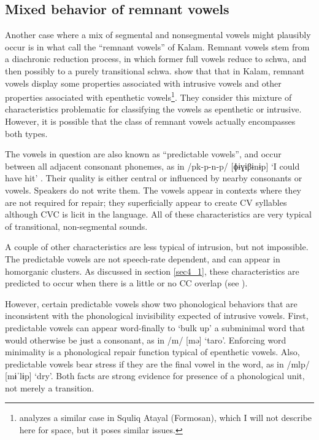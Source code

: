 \documentclass[output=paper,colorlinks,citecolor=brown]{langscibook}
\begin{document}
\subsection{Mixed behavior of remnant vowels}\label{sec4_4}

Another case where a mix of segmental and nonsegmental vowels might plausibly occur is in what \citet{Blevins&Pawley} call the “remnant vowels” of Kalam. Remnant vowels stem from a diachronic reduction process, in which former full vowels reduce to schwa, and then possibly to a purely transitional schwa. \citet{Blevins&Pawley} show that that in Kalam, remnant vowels display some properties associated with intrusive vowels and other properties associated with epenthetic vowels\footnote{\citet{huang2018nature} analyzes a similar case in Squliq Atayal (Formosan), which I will not describe here for space, but it poses similar issues.}. They consider this mixture of characteristics problematic for classifying the vowels as epenthetic or intrusive. However, it is possible that the class of remnant vowels actually encompasses both types. 

The vowels in question are also known as “predictable vowels”, and occur between all adjacent consonant phonemes, as in /pk-p-n-p/ [ɸɨɣɨβɨnɨp] ‘I could have hit’ \citep[20]{Blevins&Pawley}. Their quality is either central or influenced by nearby consonants or vowels. Speakers do not write them. The vowels appear in contexts where they are not required for repair; they superficially appear to create CV syllables although CVC is licit in the language. All of these characteristics are very typical of transitional, non-segmental sounds. 

A couple of other characteristics are less typical of intrusion, but not impossible. The predictable vowels are not speech-rate dependent, and can appear in homorganic clusters. As discussed in section \ref{sec4_1}, these characteristics are predicted to occur when there is a little or no CC overlap (see ). 

However, certain predictable vowels show two phonological behaviors that are inconsistent with the phonological invisibility expected of intrusive vowels. First, predictable vowels can appear word\hyp finally to ‘bulk up’ a subminimal word that would otherwise be just a consonant, as in /m/ [mə] ‘taro’. Enforcing word minimality is a phonological repair function typical of epenthetic vowels. Also, predictable vowels bear stress if they are the final vowel in the word, as in /mlp/ [mɨˈlɨp] ‘dry’. Both facts are strong evidence for presence of a phonological unit, not merely a transition. 
\end{document}
